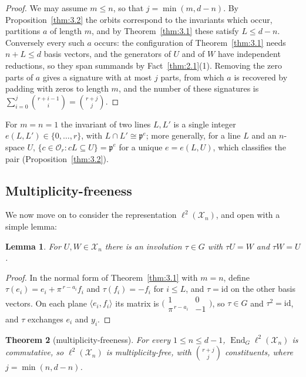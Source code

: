 \documentclass[11pt]{article}
\numberwithin{equation}{section}
\theoremstyle{plain}
\newtheorem{theorem}{Theorem}[section]
\newtheorem{lemma}[theorem]{Lemma}
\theoremstyle{definition}
\begin{document}
\begin{proof}
We may assume $m\le n$, so that $j=\min(m,d-n)$. By Proposition~\ref{thm:3.2} the
orbits correspond to the invariants which occur, partitions $a$ of length $m$, and by
Theorem~\ref{thm:3.1} these satisfy $L\le d-n$. Conversely every such $a$ occurs: the
configuration of Theorem~\ref{thm:3.1} needs $n+L\le d$ basis vectors, and the generators of $U$
and of $W$ have independent reductions, so they span summands by Fact~\ref{thm:2.1}(1). Removing
the zero parts of $a$ gives a signature with at most $j$ parts, from which $a$ is
recovered by padding with zeros to length $m$, and the number of these signatures is
$\sum_{i=0}^{j}\binom{r+i-1}{i}=\binom{r+j}{j}$.
\end{proof}

For $m=n=1$ the invariant of two lines $L,L'$ is a single integer
$e(L,L')\in\{0,\dots,r\}$, with $L\cap L'\cong\mathfrak{p}^{e}$; more generally, for a line
$L$ and an $n$-space $U$, $\{c\in \mathcal{O}_r:cL\subseteq U\}=\mathfrak{p}^{e}$ for a unique
$e=e(L,U)$, which classifies the pair (Proposition~\ref{thm:3.2}).

\subsection{Multiplicity-freeness}\label{sec:3.2}

We now move on to consider the representation $\ell^2(\mathcal{X}_n)$, and open with a simple lemma:

\begin{lemma}\label{thm:3.4}
For $U,W\in \mathcal{X}_n$ there is an involution $\tau\in G$ with
$\tau U=W$ and $\tau W=U$.
\end{lemma}

\begin{proof}
In the normal form of Theorem~\ref{thm:3.1} with $m=n$, define $\tau(e_i)=e_i+
\pi^{\,r-a_i}f_i$ and $\tau(f_i)=-f_i$ for $i\le L$, and $\tau=\mathrm{id}$ on the other
basis vectors. On each plane $\langle e_i,f_i\rangle$ its matrix is
$\bigl(\begin{smallmatrix}1&0\\ \pi^{\,r-a_i}&-1\end{smallmatrix}\bigr)$, so $\tau\in G$
and $\tau^2=\mathrm{id}$, and $\tau$ exchanges $e_i$ and $y_i$.
\end{proof}

\begin{theorem}[multiplicity-freeness]\label{thm:3.5}
For every $1\le n\le d-1$,
$\operatorname{End}_G\ell^2(\mathcal{X}_n)$ is commutative, so $\ell^2(\mathcal{X}_n)$ is
multiplicity-free, with $\binom{r+j}{j}$ constituents, where $j=\min(n,d-n)$.
\end{theorem}
\end{document}
